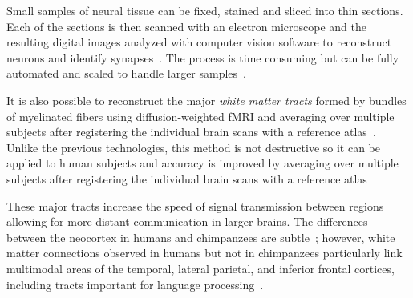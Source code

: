 Small samples of neural tissue can be fixed, stained and sliced into thin sections. Each of the sections is then scanned with an electron microscope and the resulting digital images analyzed with computer vision software to reconstruct neurons and identify synapses~\cite{MikulaandDenkNATURE-METHODS-15}. The process is time consuming but can be fully automated and scaled to handle larger samples~\cite{JanuszewskietalNATURE-METHODS-18,ZhengetalCELL-18}. 

It is also possible to reconstruct the major {\it{white matter tracts}} formed by bundles of myelinated fibers using diffusion-weighted fMRI and averaging over multiple subjects after registering the individual brain scans with a reference atlas~\cite{OishietalNEUROIMAGE-08,WakanaetalRADIOLOGY-04}. Unlike the previous technologies, this method is not destructive so it can be applied to human subjects and accuracy is improved by averaging over multiple subjects after registering the individual brain scans with a reference atlas

These major tracts increase the speed of signal transmission between regions allowing for more distant communication in larger brains. The differences between the neocortex in humans and chimpanzees are subtle~\cite{Mora-BermudezetalELIFE-16}; however, white matter connections observed in humans but not in chimpanzees particularly link multimodal areas of the temporal, lateral parietal, and inferior frontal cortices, including tracts important for language processing~\cite{ArdeschetalPNAS-19,Gomez-RoblesetalPNAS-15}.


